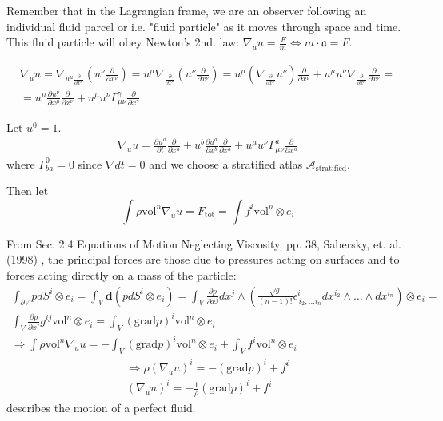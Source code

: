 \documentclass[10pt]{amsart}
\begin{document}
\begin{multicols*}{2}
Remember that in the Lagrangian frame, we are an observer following an individual fluid parcel or i.e. "fluid particle" as it moves through space and time. This fluid particle will obey Newton's 2nd. law: $\nabla_{u} u = \frac{F}{m} \Longleftrightarrow m \cdot \mathfrak{a} = F$. 

\[
\begin{gathered}
\nabla_u u = \nabla_{u^{\mu}\frac{\partial}{\partial x^{\mu}}} (u^{\nu} \frac{\partial}{\partial x^{\nu}}) = u^{\mu} \nabla_{\frac{ \partial }{\partial x^{\mu}} } (u^{\nu} \frac{ \partial }{ \partial x^{\nu}}) =  u^{\mu} \left( \nabla_{\frac{ \partial }{\partial x^{\mu}} } u^{\nu} \right) \frac{ \partial }{ \partial x^{\nu}} + u^{\mu} u^{\nu} \nabla_{\frac{ \partial }{\partial x^{\mu}} }  \frac{ \partial }{ \partial x^{\nu}} = \\
	= u^{\mu} \frac{ \partial u^{\nu} }{ \partial x^{\mu}} \frac{\partial}{\partial x^{\nu}} + u^{\mu}u^{\nu} \Gamma^{\gamma}_{\mu \nu} \frac{\partial}{\partial x^{\gamma}}
	\end{gathered}
	\]

Let $u^0 = 1$.
\[
\begin{gathered}
\nabla_u u = \frac{\partial u^a}{\partial t} \frac{\partial }{ \partial x^a} + u^b \frac{\partial u^a}{\partial x^b} \frac{\partial}{\partial x^a} + u^{\mu} u^{\nu} \Gamma^a_{\mu \nu} \frac{\partial}{\partial x^a}
\end{gathered}
\]
where $\Gamma^0_{ba} = 0$ since $\nabla dt =0$ and we choose a stratified atlas $\mathcal{A}_{\text{stratified}}$.

Then let
\[
\int \rho \text{vol}^n \nabla_u u = F_{\text{tot}}  = \int f^i \text{vol}^n \otimes e_i
\]

From Sec. 2.4 Equations of Motion Neglecting Viscosity, pp. 38, Sabersky, et. al. (1998) \cite{SAHG1998}, the principal forces are those due to pressures acting on surfaces and to forces acting directly on a mass of the particle:
\[
\begin{gathered}
\int_{\partial V} p dS^i \otimes e_i = \int_V \mathbf{d} (pdS^i \otimes e_i) = \int_V \frac{\partial p}{\partial x^j} dx^j \wedge \left( \frac{\sqrt{g}}{(n-1)!} \epsilon^i_{\, i_2, \dots i_n} dx^{i_2} \wedge \dots \wedge dx^{i_n} \right) \otimes e_i = \\
\int_V \frac{\partial p}{\partial x^j} g^{ij} \text{vol}^n \otimes e_i = \int_V (\text{grad}p)^i \text{vol}^n \otimes e_i \\
\Longrightarrow \int \rho \text{vol}^n \nabla_u u = -\int_V (\text{grad}p)^i \text{vol}^n \otimes e_i + \int_V f^i \text{vol}^n \otimes e_i
\end{gathered}
\]
\begin{equation}\label{Eq:EulerianEquationMomentumConservationFluidFlow}
\begin{gathered}
\Longrightarrow \rho (\nabla_u u)^i = -(\text{grad}p)^i + f^i \\
(\nabla_u u)^i = -\frac{1}{\rho} (\text{grad}p)^i + f^i
\end{gathered}
\end{equation}
describes the motion of a perfect fluid.


\end{multicols*}
\end{document}
